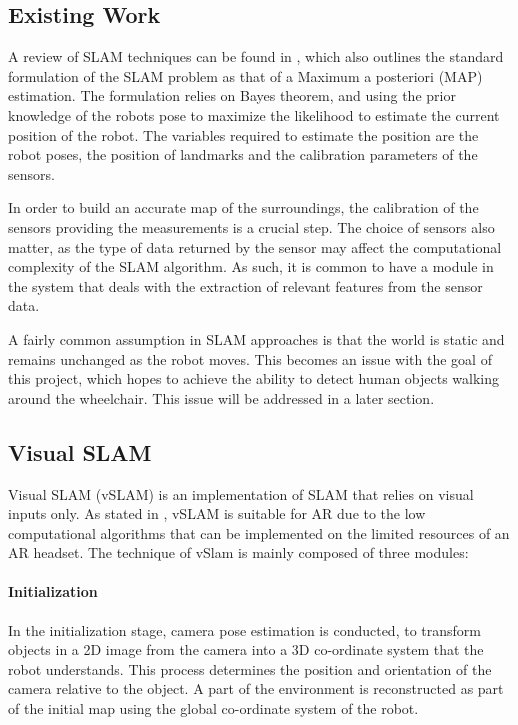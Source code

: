 \documentclass[12pt,a4paper]{report}
\begin{document}
\subsection{Existing Work}
A review of SLAM techniques can be found in \cite{Cadena2016}, which also outlines the standard formulation of the SLAM problem as that of a Maximum a posteriori (MAP) estimation. The formulation relies on Bayes theorem, and using the prior knowledge of the robots pose to maximize the likelihood to estimate the current position of the robot. The variables required to estimate the position are the robot poses, the position of landmarks and the calibration parameters of the sensors.

In order to build an accurate map of the surroundings, the calibration of the sensors providing the measurements is a crucial step. The choice of sensors also matter, as the type of data returned by the sensor may affect the computational complexity of the SLAM algorithm. As such, it is common to have a module in the system that deals with the extraction of relevant features from the sensor data.

A fairly common assumption in SLAM approaches is that the world is static and remains unchanged as the robot moves. This becomes an issue with the goal of this project, which hopes to achieve the ability to detect human objects walking around the wheelchair. This issue will be addressed in a later section.

\subsection{Visual SLAM}
Visual SLAM (vSLAM) is an implementation of SLAM that relies on visual inputs only. As stated in \cite{Taketomi2017}, vSLAM is suitable for AR due to the low computational algorithms that can be implemented on the limited resources of an AR headset. The technique of vSlam is mainly composed of three modules:

\paragraph{Initialization}
In the initialization stage, camera pose estimation is conducted, to transform objects in a 2D image from the camera into a 3D co-ordinate system that the robot understands. This process determines the position and orientation of the camera relative to the object. A part of the environment is reconstructed as part of the initial map using the global co-ordinate system of the robot.
\end{document}

